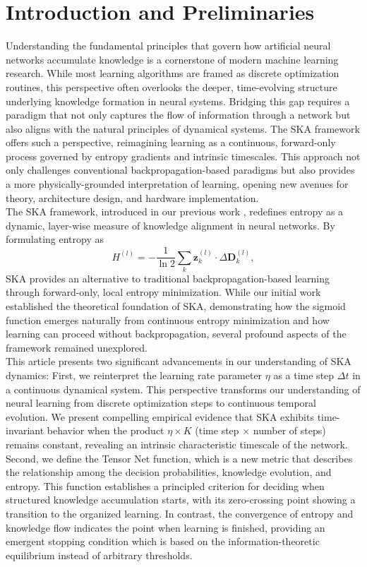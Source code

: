\documentclass{article}
\begin{document}
\section{Introduction and Preliminaries}
Understanding the fundamental principles that govern how artificial neural networks accumulate knowledge is a cornerstone of modern machine learning research. While most learning algorithms are framed as discrete optimization routines, this perspective often overlooks the deeper, time-evolving structure underlying knowledge formation in neural systems. Bridging this gap requires a paradigm that not only captures the flow of information through a network but also aligns with the natural principles of dynamical systems. The SKA framework offers such a perspective, reimagining learning as a continuous, forward-only process governed by entropy gradients and intrinsic timescales. This approach not only challenges conventional backpropagation-based paradigms but also provides a more physically-grounded interpretation of learning, opening new avenues for theory, architecture design, and hardware implementation.\\
\indent The SKA framework, introduced in our previous work \cite{mahi2025ska}, redefines entropy as a dynamic, layer-wise measure of knowledge alignment in neural networks. By formulating entropy as 
$$H^{(l)} = -\frac{1}{\ln 2} \sum_{k} \mathbf{z}^{(l)}_k \cdot \Delta\mathbf{D}^{(l)}_k,$$ 
SKA provides an alternative to traditional backpropagation-based learning through forward-only, local entropy minimization.
\indent While our initial work established the theoretical foundation of SKA, demonstrating how the sigmoid function emerges naturally from continuous entropy minimization and how learning can proceed without backpropagation, several profound aspects of the framework remained unexplored. \\
This article presents two significant advancements in our understanding of SKA dynamics: First, we reinterpret the learning rate parameter $\eta$ as a time step $\Delta t$ in a continuous dynamical system. This perspective transforms our understanding of neural learning from discrete optimization steps to continuous temporal evolution. We present compelling empirical evidence that SKA exhibits time-invariant behavior when the product $\eta \times K$ (time step $\times$ number of steps) remains constant, revealing an intrinsic characteristic timescale of the network. 
Second, we define the Tensor Net function, which is a new metric that describes the relationship among the decision probabilities, knowledge evolution, and  entropy. This function establishes a principled criterion for deciding when structured knowledge accumulation starts, with its zero-crossing point showing a transition to the organized learning. In contrast, the convergence of entropy and knowledge flow indicates the point when learning is finished, providing an emergent stopping condition which is based on the information-theoretic equilibrium instead of arbitrary thresholds. \\
\end{document}

